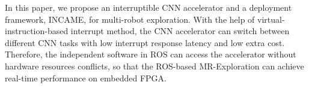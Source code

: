 \label{sec:conclusion}

In this paper, we propose an interruptible CNN accelerator and a deployment framework, INCAME, for multi-robot exploration. 
With the help of virtual-instruction-based interrupt method, the CNN accelerator can switch between different CNN tasks with low interrupt response latency and low extra cost. Therefore, the independent software in ROS can access the accelerator without hardware resources conflicts, so that the ROS-based MR-Exploration can achieve real-time performance on embedded FPGA.

